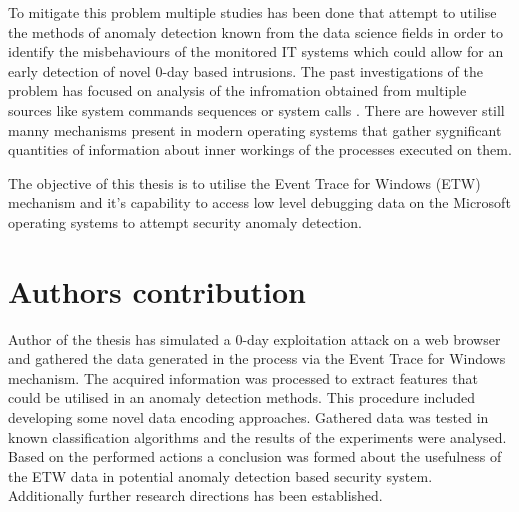 \documentclass[a4paper,twoside,12pt]{book}
\begin{document}
To mitigate this problem multiple studies has been done that attempt to utilise the methods of
anomaly detection known from the data science fields in order to identify the misbehaviours of 
the monitored IT systems which could allow for an early detection of novel 0-day based intrusions.
The past investigations of the problem has focused on analysis of the infromation obtained from 
multiple sources like system commands sequences \cite{bib:lane1997application} or system calls 
\cite{bib:rsvm}. There are however still manny mechanisms present in modern operating systems 
that gather sygnificant quantities of information about inner workings of the processes executed
on them. 

The objective of this thesis is to utilise the Event Trace for Windows (ETW) mechanism and it's 
capability to access low level debugging data on the Microsoft operating systems to attempt
security anomaly detection. 




\section{Authors contribution}

Author of the thesis has simulated a 0-day exploitation attack on a web browser and gathered 
the data generated in the process via the Event Trace for Windows mechanism. The acquired 
information was processed to extract features that could be utilised in an anomaly detection
methods. This procedure included developing some novel data encoding approaches. Gathered data
was tested in known classification algorithms and the results of the experiments were analysed.
Based on the performed actions a conclusion was formed about the usefulness of the ETW data
in potential anomaly detection based security system. Additionally further research directions
has been established.
\end{document}
